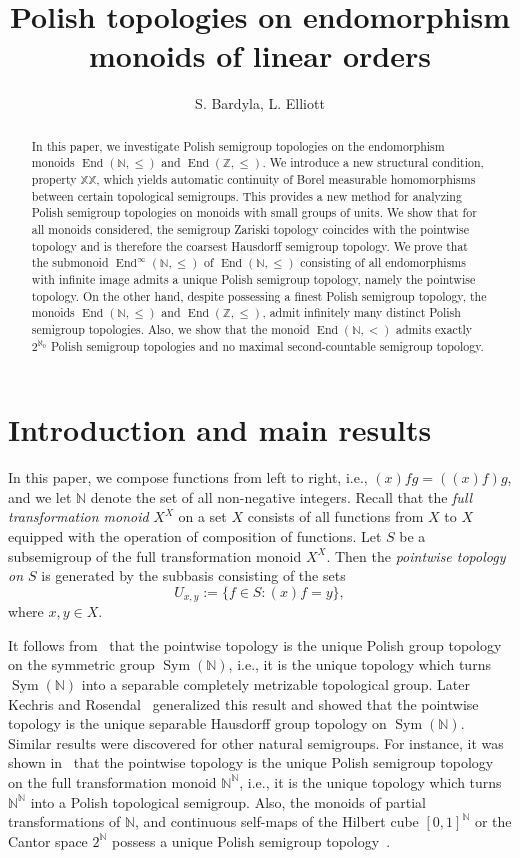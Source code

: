 \documentclass[11pt]{amsart}
\title{Polish topologies on endomorphism monoids of linear orders}
\author{S. Bardyla, L. Elliott}
\theoremstyle{definition}
\newcommand{\N}{\mathbb N}
\newcommand{\Sym}{\operatorname{Sym}}
\begin{document}
\begin{abstract}
In this paper, we investigate Polish semigroup topologies on the endomorphism monoids   $\operatorname{End}(\mathbb{N},\leq)$ and $\operatorname{End}(\mathbb{Z},\leq)$. We introduce a new structural condition, property $\mathbb{XX}$, which yields automatic continuity of Borel measurable homomorphisms between certain topological semigroups. This provides a new method for analyzing Polish semigroup topologies on monoids with small groups of units. We show that for all monoids considered, the semigroup Zariski topology coincides with the pointwise topology and is therefore the coarsest Hausdorff semigroup topology. We prove that the submonoid $\operatorname{End}^{\infty}(\mathbb{N},\leq)$ of $\operatorname{End}(\mathbb{N},\leq)$ consisting of all endomorphisms with infinite image admits a unique Polish semigroup topology, namely the pointwise topology. On the other hand, despite possessing a finest Polish semigroup topology, 
the monoids $\operatorname{End}(\mathbb{N},\leq)$ and $\operatorname{End}(\mathbb{Z},\leq)$, admit infinitely many distinct Polish semigroup topologies. Also, we show that the monoid $\operatorname{End}(\mathbb{N},<)$ admits exactly $2^{\aleph_0}$ Polish semigroup topologies and no maximal second-countable semigroup topology.  
\end{abstract}
\maketitle


\tableofcontents

\section{Introduction and main results}
In this paper, we compose functions from left to right, i.e., $(x)fg=((x)f)g$, and we let $\N$ denote the set of all non-negative integers.
Recall that the {\em full transformation monoid} $X ^ X$ on a set $X$ consists of all functions from $X$ to $X$ equipped with the operation of composition of functions. 
Let $S$ be a subsemigroup of the full transformation monoid $X^X$. Then the {\em pointwise topology on $S$} is generated by the subbasis consisting of the sets $$U_{x,y}:=\{f\in S: (x)f=y\},$$ where $x,y\in X$. 

It follows from~\cite{BGP, Gaughan} that the pointwise topology is the unique Polish group topology on the symmetric group $\Sym(\N)$, i.e., it is the unique topology which turns $\Sym(\N)$ into a separable completely metrizable topological group. Later Kechris and Rosendal~\cite{KR} generalized this result and showed that the pointwise topology is the unique separable Hausdorff group topology on $\Sym(\N)$. Similar results were discovered for other natural semigroups. For instance, it was shown in~\cite{main} that the pointwise topology is the unique Polish semigroup topology on the full transformation monoid $\N^\N$, i.e., it is the unique topology which turns $\N^\N$ into a Polish topological semigroup. Also, the monoids of partial transformations of $\N$, and continuous self-maps of the Hilbert cube $[0,1]^\N$ or the Cantor space $2^\N$ possess a unique Polish semigroup topology~\cite{main}. 
\end{document}
